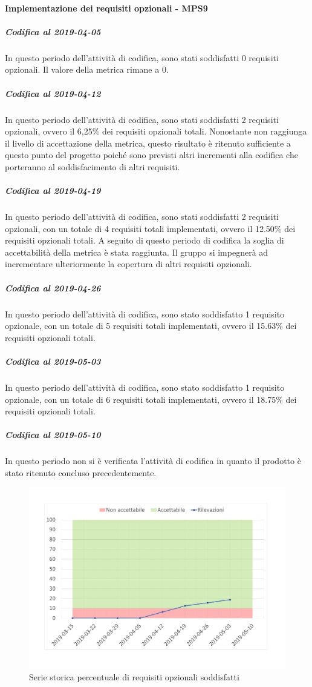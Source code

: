 \paragraph{Implementazione dei requisiti opzionali - MPS9}
\subparagraph{Codifica al 2019-04-05}
In questo periodo dell'attività di codifica, sono stati soddisfatti 0 requisiti opzionali. Il valore della metrica rimane a 0.

\subparagraph{Codifica al 2019-04-12}
In questo periodo dell'attività di codifica, sono stati soddisfatti 2 requisiti opzionali, ovvero il 6,25\% dei requisiti opzionali totali.
Nonostante non raggiunga il livello di accettazione della
metrica, questo risultato è ritenuto sufficiente a questo punto del progetto poiché sono previsti altri incrementi alla codifica che porteranno al soddisfacimento di altri requisiti.

\subparagraph{Codifica al 2019-04-19}
In questo periodo dell'attività di codifica, sono stati soddisfatti 2 requisiti opzionali, con un totale di 4 requisiti totali implementati, ovvero il 12.50\% dei requisiti opzionali totali.
A seguito di questo periodo di codifica la soglia di accettabilità della metrica è stata raggiunta.
Il gruppo si impegnerà ad incrementare ulteriormente la copertura di altri requisiti opzionali.

\subparagraph{Codifica al 2019-04-26}
In questo periodo dell'attività di codifica, sono stato soddisfatto 1 requisito opzionale, con un totale di 5 requisiti totali implementati, ovvero il 15.63\% dei requisiti opzionali totali.

\subparagraph{Codifica al 2019-05-03}
In questo periodo dell'attività di codifica, sono stato soddisfatto 1 requisito opzionale, con un totale di 6 requisiti totali implementati, ovvero il 18.75\% dei requisiti opzionali totali.

\subparagraph{Codifica al 2019-05-10}
In questo periodo non si è verificata l'attività di codifica in quanto il prodotto è stato ritenuto concluso precedentemente.

\begin{figure}[H]
	\centering
	\includegraphics[scale=0.6]{images/resoconto/MPS9Chart.pdf}
	\caption{Serie storica percentuale di requisiti opzionali soddisfatti}	
\end{figure}

